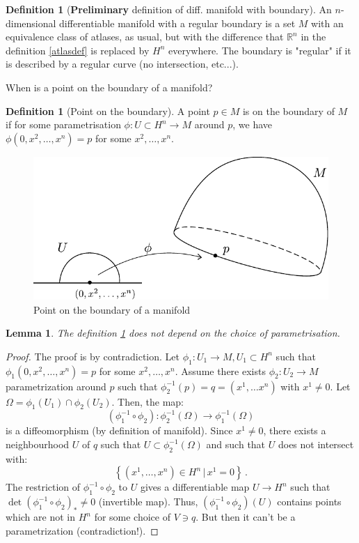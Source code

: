 \documentclass[a4paper,11pt,titlepage, article, oneside]{memoir}
\numberwithin{equation}{section}
\newtheorem{lemma}[theorem]{Lemma}
\theoremstyle{definition}
\newtheorem{definition}[theorem]{Definition}
\theoremstyle{remark}
\newcommand{\rfield}{\mathbb{R}}
\begin{document}
\begin{definition}[\textbf{Preliminary} definition of diff. manifold with boundary]
  An $n$-dimensional differentiable manifold with a regular boundary is a set $M$ with an equivalence class of atlases, as usual, but with the difference that $\rfield^n$ in the definition \ref{atlasdef} is replaced by $H^n$ everywhere. The boundary is "regular" if it is described by a regular curve (no intersection, etc...).
\end{definition}

When is a point on the boundary of a manifold?
\begin{definition} [Point on the boundary] \label{pointbdr}
  A point $p \in M$ is on the boundary of $M$ if for some parametrisation $\phi \colon U \subset H^n \rightarrow M$ around $p$, we have $\phi(0, x^2, \ldots, x^n) = p$ for some $x^2, \ldots, x^n$.
  \begin{figure}[H]
     \centering
     \includegraphics[width=.6\linewidth]{images/boundary.pdf}
     \caption{Point on the boundary of a manifold} \label{Fig:boundarypic}
\end{figure}
\end{definition}

\begin{lemma}
  The definition \ref{pointbdr} does not depend on the choice of parametrisation.
\end{lemma}
\begin{proof}
The proof is by contradiction.
Let $\phi_1 \colon U_1 \rightarrow M, U_1 \subset H^n$ such that $\phi_1(0, x^2, \ldots, x^n)=p$ for some $x^2, \ldots, x^n$. Assume there exists $\phi_2 \colon U_2 \rightarrow M$ parametrization around $p$ such that $\phi_2^{-1}(p) = q = (x^1, \ldots x^n)$ with $x^1 \not = 0$. Let $\Omega = \phi_1(U_1) \cap \phi_2(U_2)$. Then, the map:
\[\left ( \phi_1^{-1} \circ \phi_2 \right) \colon \phi_2^{-1}(\Omega) \rightarrow \phi_1^{-1}(\Omega)\]
is a diffeomorphism (by definition of manifold). Since $x^1 \not = 0$, there exists a neighbourhood $U$ of $q$ such that $U \subset \phi_2^{-1}(\Omega)$ and such that $U$ does not intersect with:
\[\left \{ (x^1, \ldots , x^n ) \in H^n \, | \, x^1= 0 \right \} \, . \]
The restriction of $\phi_1^{-1} \circ \phi_2$ to $U$ gives a differentiable map $U \rightarrow H^n$ such that $\det(\phi_1^{-1} \circ \phi_2)_* \not = 0$ (invertible map). Thus, $(\phi_1^{-1} \circ \phi_2)(U)$ contains points which are not in $H^n$ for some choice of $V \ni q$. But then it can't be a parametrization (contradiction!).
\end{proof}
\end{document}
